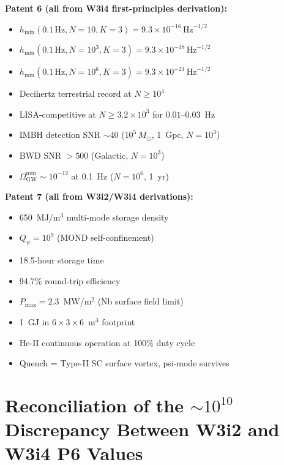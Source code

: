 \documentclass[11pt]{article}
\theoremstyle{definition}
\theoremstyle{remark}
\newcommand{\ee}[1]{\times10^{#1}}
\newcommand{\Qpsi}{Q_\psi}
\newcommand{\sqrtHz}{\,\mathrm{Hz}^{-1/2}}
\newcommand{\Msun}{M_\odot}
\newcommand{\Pmax}{P_{\mathrm{max}}}
\begin{document}
\begin{tcolorbox}[colback=green!5!white, colframe=green!40!black,
  title=Values Confirmed by W3i5 Audit]
\textbf{Patent 6 (all from W3i4 first-principles derivation):}
\begin{itemize}
\item $h_{\min}(0.1\,\mathrm{Hz}, N=10, K=3) = 9.3\ee{-16}\sqrtHz$
\item $h_{\min}(0.1\,\mathrm{Hz}, N=10^3, K=3) = 9.3\ee{-18}\sqrtHz$
\item $h_{\min}(0.1\,\mathrm{Hz}, N=10^6, K=3) = 9.3\ee{-21}\sqrtHz$
\item Decihertz terrestrial record at $N \geq 10^4$
\item LISA-competitive at $N \geq 3.2\ee{3}$ for $0.01$--$0.03$~Hz
\item IMBH detection SNR $\sim 40$ ($10^5\,\Msun$, 1~Gpc, $N=10^3$)
\item BWD SNR $> 500$ (Galactic, $N=10^3$)
\item $\Omega_{\mathrm{GW}}^{\min} \sim 10^{-12}$ at 0.1~Hz ($N=10^6$, 1~yr)
\end{itemize}

\textbf{Patent 7 (all from W3i2/W3i4 derivations):}
\begin{itemize}
\item 650~MJ/m$^3$ multi-mode storage density
\item $\Qpsi = 10^9$ (MOND self-confinement)
\item 18.5-hour storage time
\item 94.7\% round-trip efficiency
\item $\Pmax = 2.3$~MW/m$^2$ (Nb surface field limit)
\item 1~GJ in $6\times3\times6$~m$^3$ footprint
\item He-II continuous operation at 100\% duty cycle
\item Quench = Type-II SC surface vortex, psi-mode survives
\end{itemize}
\end{tcolorbox}

\section{Reconciliation of the $\sim 10^{10}$ Discrepancy Between W3i2 and W3i4 P6 Values}
\label{sec:reconciliation}
\end{document}
